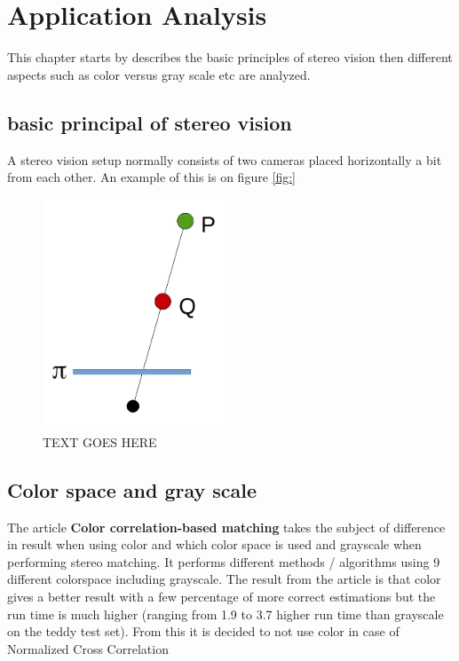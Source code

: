\chapter{Application Analysis} \label{ch:appanalysis}
This chapter starts by describes the basic principles of stereo vision then different aspects such as color versus gray scale etc are analyzed. 

\section{basic principal of stereo vision}
A stereo vision setup normally consists of two cameras placed horizontally a bit from each other. An example of this is on figure \ref{fig:}


\begin{figure}[ht!]
  \centering
  \includegraphics[width=0.5\textwidth]{figures/singlecam}
  \caption{TEXT GOES HERE}
  \label{fig:LABEL}
\end{figure}





\section{Color space and gray scale}
The article \textbf{Color correlation-based matching} takes the subject of difference in result when using color and which color space is used and grayscale when performing stereo matching. It performs different methods / algorithms using 9 different colorspace including grayscale. The result from the article is that color gives a better result with a few percentage of more correct estimations but the run time is much higher (ranging from 1.9 to 3.7 higher run time than grayscale on the teddy test set).
From this it is decided to not use color in case of Normalized Cross Correlation


